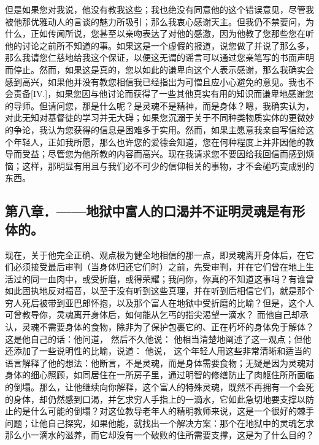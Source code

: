 但是如果您对我说，他没有教我这些；我也绝没有同意他的这个错误意见，尽管我被他那优雅动人的言谈的魅力所吸引；那么我衷心感谢天主。但我仍不禁要问，为什么，正如传闻所说，您甚至以亲吻表达了对他的感激，因为他教了您那些您在听他的讨论之前所不知道的事。如果这是一个虚假的报道，说您做了并说了那么多，那么我请您仁慈地给我这个保证，以便这无谓的谣言可以通过您亲笔写的书面声明而停止。然而，如果这是真的，您以如此的谦卑向这个人表示感谢，那么我确实会感到高兴，如果他并没有教您相信我已经指出为可憎且应小心避免的意见。我也不会责备[IV.]，如果您因与他讨论而获得了一些其他真实有用的知识而谦卑地感谢您的导师。但请问您，那是什么呢？是灵魂不是精神，而是身体？嗯，我确实认为，对此无知对基督徒的学习并无大碍；如果您沉溺于关于不同种类物质实体的更微妙的争论，我认为您获得的信息是困难多于实用。然而，如果主愿意我亲自写信给这个年轻人，正如我所愿，那么也许您的爱德会知道，您在何种程度上并非因他的教导而受益；尽管您为他所教的内容而高兴。现在我请求您不要因给我回信而感到烦恼；这样，那明显有用且与我们必不可少的信仰相关的事物，才不会碰巧变成别的东西。\par


\subsection{第八章．——地狱中富人的口渴并不证明灵魂是有形体的。}

现在，关于他完全正确、观点极为健全地相信的那一点，即灵魂离开身体后，在它们必须接受最后审判（当身体归还它们时）之前，先受审判，并在它们曾在地上生活过的同一血肉中，或受折磨，或得荣耀；我问你，你真的不知道这事吗？有谁曾如此固执地反对福音，以至于没有听到这些真理，并在听到后相信它们，就是那个穷人死后被带到亚巴郎怀抱，以及那个富人在地狱中受折磨的比喻？但是，这个人可曾教导你，灵魂离开身体后，如何能从乞丐的指尖渴望一滴水？ 而他自己却承认，灵魂不需要身体的食物，除非为了保护包裹它的、正在朽坏的身体免于解体？这是他自己的话：他问道， 然后不久他说： 他相当清楚地阐述了这一观点；但他还添加了一些说明性的比喻，说道： 他说， 这个年轻人用这些非常清晰和适当的语言解释了他的想法：他断言，不是灵魂，而是身体需要食物；无疑是因为灵魂对身体的细心照顾，如同居住在一所房子里，通过明智的修缮防止了肉躯住所所面临的倒塌。那么，让他继续向你解释，这个富人的特殊灵魂，既然不再拥有一个会死的身体，却仍然感到口渴，并乞求穷人手指上的一滴水，它如此急切地要支撑以防止的是什么可能的倒塌？对这位教导老年人的精明教师来说，这是一个很好的棘手问题；让他自己探究，如果他能，就找出一个解决方案：那个在地狱中的灵魂乞求那么小一滴水的滋养，而它却没有一个破败的住所需要支撑，这是为了什么目的？\par

